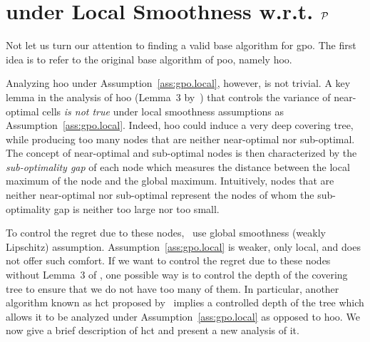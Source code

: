 \section{\HCT{} under Local Smoothness w.r.t. \texorpdfstring{$\mathcal{P}$}{}}\label{sec:gpo.hct}

Not let us turn our attention to finding a valid base algorithm for \gls{gpo}. The first idea is to refer to the original base algorithm of \gls{poo}, namely \gls{hoo}. 

Analyzing \gls{hoo}{} under Assumption~\ref{ass:gpo.local}, however, is not trivial. A key lemma in the analysis of \gls{hoo} (Lemma~3 by~\citealt{bubeck2011pure}) that controls the variance of near-optimal cells \emph{is not true} under local smoothness assumptions as Assumption~\ref{ass:gpo.local}. Indeed, \gls{hoo} could induce a very deep covering tree, while producing too many nodes that are neither near-optimal nor sub-optimal. The concept of near-optimal and sub-optimal nodes is then characterized by the \emph{sub-optimality gap} of each node which measures the distance between the local maximum of the node and the global maximum. Intuitively, nodes that are neither near-optimal nor sub-optimal represent the nodes of whom the sub-optimality gap is neither too large nor too small. 

To control the regret due to these nodes,~\cite{bubeck2011pure} use global smoothness (weakly Lipschitz) assumption. Assumption~\ref{ass:gpo.local} is weaker, only local, and does not offer such comfort. If we want to control the regret due to these nodes without Lemma~3 of \citet{bubeck2011pure}, one possible way is to control the depth of the covering tree to ensure that we do not have too many of them. In particular, another algorithm known as \gls{hct} proposed by~\cite{azar2014online} implies a controlled depth of the tree which allows it to be analyzed under Assumption~\ref{ass:gpo.local} as opposed to \gls{hoo}{}. We now give a brief description of \gls{hct}{} and present a new analysis of it.

